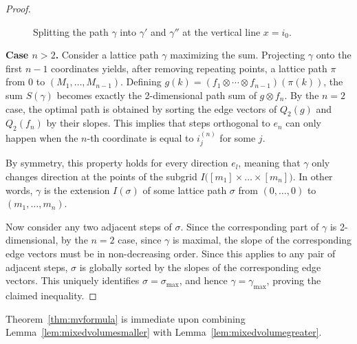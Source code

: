 \documentclass[a4paper,reqno,12pt]{amsart}
\newcommand{\1}{\bo{1}}
\begin{document}
\begin{proof}
\begin{figure}[ht]
	\caption{Splitting the path $\gamma$ into $\gamma'$ and $\gamma''$ at the vertical line $x=i_0$.}
	\label{fig:path_split}
\end{figure}

\noindent\textbf{Case $n > 2$.} Consider a lattice path $\gamma$ maximizing the sum. Projecting $\gamma$ onto the first $n-1$ coordinates yields, after removing repeating points, a lattice path $\pi$ from $0$ to $(M_1,\dots,M_{n-1})$. Defining $g(k) = (f_1\otimes\cdots\otimes f_{n-1})(\pi(k))$, the sum $S(\gamma)$ becomes exactly the 2-dimensional path sum of $g \otimes f_n$. By the $n=2$ case, the optimal path is obtained by sorting the edge vectors of $Q_2(g)$ and $Q_2(f_n)$ by their slopes. This implies that steps orthogonal to $e_n$ can only happen when the $n$-th coordinate is equal to $i_j^{(n)}$ for some $j$. 

By symmetry, this property holds for every direction $e_l$, meaning that $\gamma$ only changes direction at the points of the subgrid $I\big([m_1]\times \dots \times [m_n]\big)$. In other words, $\gamma$ is the extension $I(\sigma)$ of some lattice path $\sigma$ from $(0,\dots,0)$ to $(m_1,\dots,m_n)$.

Now consider any two adjacent steps of $\sigma$. Since the corresponding part of $\gamma$ is 2-dimensional, by the $n=2$ case, since $\gamma$ is maximal, the slope of the corresponding edge vectors must be in non-decreasing order. Since this applies to any pair of adjacent steps, $\sigma$ is globally sorted by the slopes of the corresponding edge vectors. This uniquely identifies $\sigma = \sigma_{\mathrm{max}}$, and hence $\gamma = \gamma_{\mathrm{max}}$, proving the claimed inequality.
\end{proof}
Theorem~\ref{thm:mvformula} is immediate upon combining Lemma~\ref{lem:mixedvolumesmaller} with Lemma~\ref{lem:mixedvolumegreater}.
\end{document}
